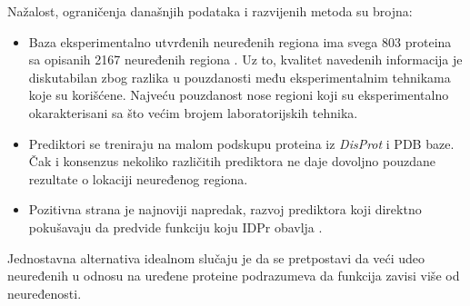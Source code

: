 Nažalost, ograničenja današnjih podataka i razvijenih metoda su brojna:
\begin{itemize}
  \item
    Baza eksperimentalno utvrđenih neuređenih regiona
    \textit{} ima svega 803 proteina sa opisanih 2167
    neuređenih regiona \parencite{Piovesan2016}.  Uz to, kvalitet navedenih
    informacija je diskutabilan zbog razlika u pouzdanosti među
    eksperimentalnim tehnikama koje su korišćene.  Najveću pouzdanost nose
    regioni koji su eksperimentalno okarakterisani sa što većim brojem
    laboratorijskih tehnika.

  \item
    Prediktori se treniraju na malom podskupu proteina iz \textit{DisProt}
    i PDB  baze. Čak i konsenzus nekoliko različitih prediktora ne daje
    dovoljno pouzdane rezultate o lokaciji neuređenog regiona.

  \item 
    Pozitivna strana je najnoviji napredak, razvoj prediktora koji direktno
    pokušavaju da predvide funkciju koju IDPr obavlja \parencite{Meng_c2017}.

\end{itemize}

Jednostavna alternativa idealnom slučaju je da se pretpostavi da veći udeo neuređenih u odnosu
na uređene proteine podrazumeva da funkcija zavisi više od neuređenosti. 

